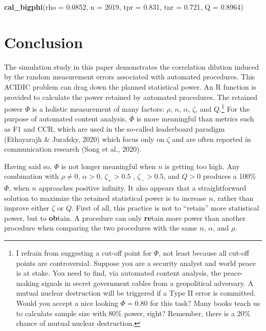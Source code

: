 \documentclass[english,man,floatsintext]{apa6}
\newenvironment{Shaded}{\begin{snugshade}}{\end{snugshade}}
\newcommand{\DataTypeTok}[1]{\textcolor[rgb]{0.13,0.29,0.53}{#1}}
\newcommand{\DecValTok}[1]{\textcolor[rgb]{0.00,0.00,0.81}{#1}}
\newcommand{\FloatTok}[1]{\textcolor[rgb]{0.00,0.00,0.81}{#1}}
\newcommand{\KeywordTok}[1]{\textcolor[rgb]{0.13,0.29,0.53}{\textbf{#1}}}
\newcommand{\NormalTok}[1]{#1}
\begin{document}
\begin{Shaded}
\begin{Highlighting}[]
\KeywordTok{cal_bigphi}\NormalTok{(}\DataTypeTok{rho =} \FloatTok{0.0852}\NormalTok{, }\DataTypeTok{n =} \DecValTok{2019}\NormalTok{,}
           \DataTypeTok{tpr =} \FloatTok{0.831}\NormalTok{, }\DataTypeTok{tnr =} \FloatTok{0.721}\NormalTok{,}
           \DataTypeTok{Q =} \FloatTok{0.8964}\NormalTok{)}
\end{Highlighting}
\end{Shaded}

\hypertarget{conclusion}{%
\section{Conclusion}\label{conclusion}}

The simulation study in this paper demonstrates the correlation dilution induced by the random measurement errors associated with automated procedures. This ACIDIC problem can drag down the planned statistical power. An R function is provided to calculate the power retained by automated procedures. The retained power \(\Phi\) is a holistic measurement of many factors: \(\rho\), \(n\), \(\alpha\), \(\zeta\), and \(Q\).\footnote{I refrain from suggesting a cut-off point for \(\Phi\), not least because all cut-off points are controversial. Suppose you are a security analyst and world peace is at stake. You need to find, via automated content analysis, the peace-making signals in secret government cables from a geopolitical adversary. A mutual nuclear destruction will be triggered if a Type II error is committed. Would you accept a nice looking \(\Phi = 0.80\) for this task? Many books teach us to calculate sample size with 80\% power, right? Remember, there is a 20\% chance of mutual nuclear destruction.} For the purpose of automated content analysis, \(\Phi\) is more meaningful than metrics such as F1 and CCR, which are used in the so-called leaderboard paradigm (Ethayarajh \& Jurafsky, 2020) which focus only on \(\zeta\) and are often reported in communication research (Song et al., 2020).

Having said so, \(\Phi\) is not longer meaningful when \(n\) is getting too high. Any combination with \(\rho \ne 0\), \(\alpha > 0\), \(\zeta_{+} > 0.5\) , \(\zeta_{-} > 0.5\), and \(Q > 0\) produces a 100\% \(\Phi\), when \(n\) approaches positive infinity. It also appears that a straightforward solution to maximize the retained statistical power is to increase \(n\), rather than improve either \(\zeta\) or \(Q\). First of all, this practice is not to \enquote{retain} more statistical power, but to \textbf{ob}tain. A procedure can only \textbf{re}tain more power than another procedure when comparing the two procedures with the same \(n\), \(\alpha\), and \(\rho\).
\end{document}
